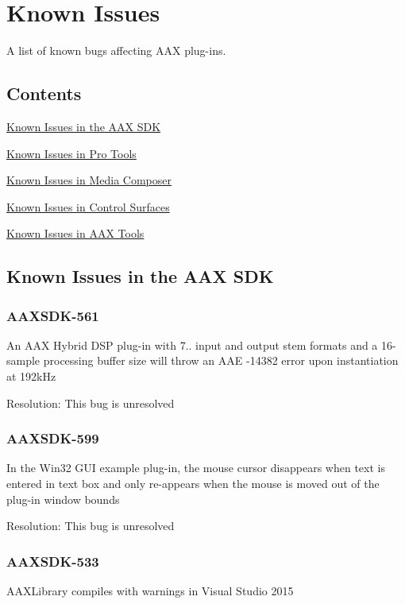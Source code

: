 \hypertarget{a00374}{}\section{Known Issues}
\label{a00374}
A list of known bugs affecting A\+A\+X plug-\/ins. 

\hypertarget{a00374_knownissues_contents}{}\subsection{Contents}\label{a00374_knownissues_contents}
\begin{DoxyItemize}
\item \hyperlink{a00374_knownissues_aaxsdk}{Known Issues in the A\+A\+X S\+D\+K} \item \hyperlink{a00374_knownissues_ptsw}{Known Issues in Pro Tools} \item \hyperlink{a00374_knownissues_mc}{Known Issues in Media Composer} \item \hyperlink{a00374_knownissues_cs}{Known Issues in Control Surfaces} \item \hyperlink{a00374_knownissues_tools}{Known Issues in A\+A\+X Tools}\end{DoxyItemize}
\hypertarget{a00374_knownissues_aaxsdk}{}\subsection{Known Issues in the A\+A\+X S\+D\+K}\label{a00374_knownissues_aaxsdk}
\hypertarget{a00374_AAXSDK-561}{}\subsubsection{A\+A\+X\+S\+D\+K-\/561}\label{a00374_AAXSDK-561}
An A\+A\+X Hybrid D\+S\+P plug-\/in with 7.. input and output stem formats and a 16-\/sample processing buffer size will throw an A\+A\+E -\/14382 error upon instantiation at 192k\+Hz

Resolution\+: This bug is unresolved\hypertarget{a00374_AAXSDK-599}{}\subsubsection{A\+A\+X\+S\+D\+K-\/599}\label{a00374_AAXSDK-599}
In the Win32 G\+U\+I example plug-\/in, the mouse cursor disappears when text is entered in text box and only re-\/appears when the mouse is moved out of the plug-\/in window bounds

Resolution\+: This bug is unresolved\hypertarget{a00374_AAXSDK-533}{}\subsubsection{A\+A\+X\+S\+D\+K-\/533}\label{a00374_AAXSDK-533}
A\+A\+X\+Library compiles with warnings in Visual Studio 2015

